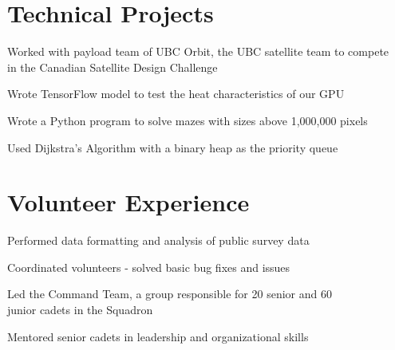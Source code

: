 \documentclass[]{deedy-resume-openfont}
\begin{document}
    \section{Technical Projects}
    
    \begin{tightemize}
    \item Worked with payload team of UBC Orbit, the UBC satellite team to compete \\ in the Canadian Satellite Design Challenge 
    \item Wrote TensorFlow model to test the heat characteristics of our GPU 
    \end{tightemize}
    \sectionsep
    
    \begin{tightemize}
    \item Wrote a Python program to solve mazes with sizes above 1,000,000 pixels
    \item Used Dijkstra’s Algorithm with a binary heap as the priority queue
    \end{tightemize}
    \sectionsep
    
    
    \section{Volunteer Experience}
    \begin{tightemize}
    \item Performed data formatting and analysis of public survey data
    \item Coordinated volunteers - solved basic bug fixes and issues
    \end{tightemize}
    \sectionsep
    
    \begin{tightemize}
    \item Led the Command Team, a group responsible for 20 senior and 60 \\  junior cadets in the Squadron 
    \item Mentored senior cadets in leadership and organizational skills
    \end{tightemize}
    \sectionsep
    
\end{document}
